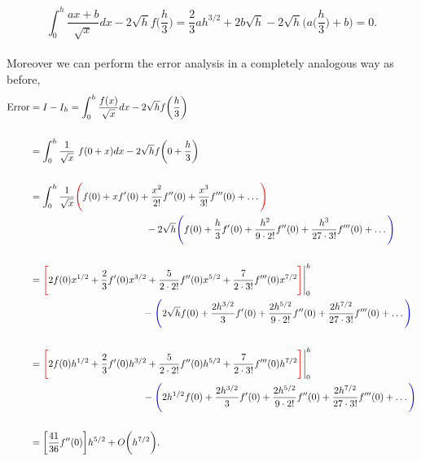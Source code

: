 \documentclass[paper=a4, fontsize=11pt]{scrartcl} %
\numberwithin{equation}{section} %
\numberwithin{figure}{section} %
\numberwithin{table}{section} %
\begin{document}
 $$\int_0^h \frac{ax+b}{\sqrt{x}} dx - 2\sqrt{h} f\bigg(\frac{h}{3}\bigg) = \frac{2}{3}ah^{3/2} + 2b\sqrt{h} - 2\sqrt{h}\Big( a\bigg(\frac{h}{3}\bigg) + b \Big) = 0.$$\\
 
 Moreover we can perform the error analysis in a completely analogous way as before, \\
 
 \begin{align}
 \nonumber
 \begin{split}
 \mbox{Error} &= I - I_h = \int_0^h \frac{f(x)}{\sqrt{x}} dx - 2\sqrt{h} f\bigg(\frac{h}{3}\bigg) \\ \\
 		     &= \int_0^h \frac{1}{\sqrt{x}}\ f(0 + x) dx - 2\sqrt{h} f\bigg(0 + \frac{h}{3}\bigg) \\ \\
		     &= \int_0^h \frac{1}{\sqrt{x}}\textcolor{red}{\Bigg(} f(0) + xf'(0) + \frac{x^2}{2!} f''(0) + \frac{x^3}{3!} f'''(0) +\ldots \textcolor{red}{\Bigg)} \\
		     &\ \ \ \ \ \ \  \ \ \ \ \ \ \ \ \ \ \ \  \ \ \ \ \ \ \ \ \ \  \ \ \ \ \ \ \ - 2\sqrt{h} \textcolor{blue}{\Bigg(}   f(0) + \frac{h}{3} f'(0) + \frac{h^2}{9\cdot 2!} f''(0) + \frac{h^3}{27\cdot 3!} f'''(0) +\ldots \textcolor{blue}{\Bigg)} \\ \\
		     &=\textcolor{red}{\Bigg[} 2f(0)x^{1/2} + \frac{2}{3}f'(0)x^{3/2} + \frac{5}{2\cdot 2!}f''(0) x^{5/2} + \frac{7}{2\cdot 3!} f'''(0) x^{7/2} \textcolor{red}{\Bigg]}\Bigg|_0^h  \\
		     & \ \ \ \ \  \ \ \ \ \  \ \ \ \ \ \ \ \  \ \ \ \ \ \ \ \  \ \ \ \ \ \ \ \ \ -\textcolor{blue}{\Bigg(}   2\sqrt{h} f(0) + \frac{2h^{3/2}}{3} f'(0) + \frac{2h^{5/2}}{9\cdot 2!} f''(0) + \frac{2h^{7/2}}{27\cdot 3!} f'''(0) +\ldots \textcolor{blue}{\Bigg)}\\ \\
		     &=\textcolor{red}{\Bigg[} 2f(0)h^{1/2} + \frac{2}{3}f'(0)h^{3/2} + \frac{5}{2\cdot 2!}f''(0) h^{5/2} + \frac{7}{2\cdot 3!} f'''(0) h^{7/2} \textcolor{red}{\Bigg]}\Bigg|_0^h  \\
		     & \ \ \ \ \  \ \ \ \ \  \ \ \ \ \ \ \ \  \ \ \ \ \ \ \ \  \ \ \ \ \ \ \ \ \ -\textcolor{blue}{\Bigg(}   2h^{1/2} f(0) + \frac{2h^{3/2}}{3} f'(0) + \frac{2h^{5/2}}{9\cdot 2!} f''(0) + \frac{2h^{7/2}}{27\cdot 3!} f'''(0) +\ldots \textcolor{blue}{\Bigg)} \\ \\
		     &= \bigg[ \frac{41}{36} f''(0) \bigg] h^{5/2} + O\bigg(h^{7/2}\bigg).   \\
 \end{split}
 \end{align}
 
\end{document}
